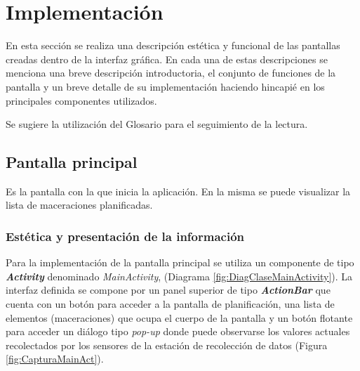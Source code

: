 \section{Implementación}
    \par En esta sección se realiza una descripción estética y funcional de las pantallas creadas dentro de la interfaz gráfica. En cada una de estas descripciones se menciona una breve descripción introductoria, el conjunto de funciones de la pantalla y un breve detalle de su implementación haciendo hincapié en los principales componentes utilizados.
    
    \par Se sugiere la utilización del Glosario para el seguimiento de la lectura.
     
    \subsection{Pantalla principal}
        \label{DescripPantallaPrincipal}
            \par Es la pantalla con la que inicia la aplicación. En la misma se puede visualizar la lista de maceraciones planificadas.
           
            \subsubsection{Estética y presentación de la información}
                \par Para la implementación de la pantalla principal se utiliza un componente de tipo \textbf{\textit{\gls{Activity}}} denominado \textit{MainActivity}, (Diagrama \ref{fig:DiagClaseMainActivity}). La interfaz definida se compone por un panel superior de tipo \textbf{\textit{\gls{ActionBar}}} que cuenta con un botón para acceder a la pantalla de planificación, una lista de elementos (maceraciones) que ocupa el cuerpo de la pantalla y un botón flotante para acceder un diálogo tipo \textit{pop-up} donde puede observarse los valores actuales recolectados por los sensores de la estación de recolección de datos (Figura \ref{fig:CapturaMainAct}). 
                

